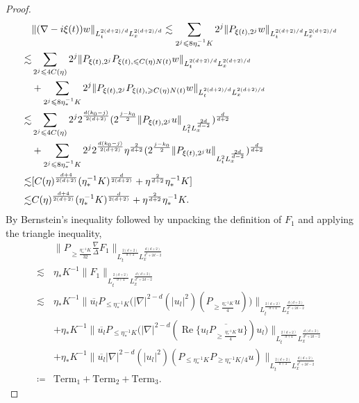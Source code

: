 \documentclass[reqno,11pt]{amsart}
\theoremstyle{plain}
\theoremstyle{definition}
\numberwithin{equation}{section}
\numberwithin{theorem}{section}
\def\geq{\geqslant}
\def\leq{\leqslant}
\begin{document}
\begin{proof}
\begin{align}
    &\| (\nabla -i\xi(t))w\|_{L_{t}^{2(d+2)/d}L_{x}^{2(d+2)/d}}\lesssim \sum_{2^j\leq 8\eta_{\ast}^{-1}K} 2^{j}\|P_{\xi(t),2^j}w\|_{L_{t}^{2(d+2)/d}L_{x}^{2(d+2)/d}}\notag\\
    \lesssim&\sum_{2^j\leq4C(\eta)} 2^{j}\|P_{\xi(t),2^j}P_{\xi(t),\leq C(\eta)N(t)}w\|_{L_{t}^{2(d+2)/d}L_{x}^{2(d+2)/d}}\\
    &+\sum_{2^j\leq 8\eta_{\ast}^{-1}K} 2^{j}\|P_{\xi(t),2^j}P_{\xi(t),\geq C(\eta)N(t)}w\|_{L_{t}^{2(d+2)/d}L_{x}^{2(d+2)/d}}\notag\\
    \lesssim& \sum_{2^j\leq4C(\eta)} 2^{j}2^{\frac{d(k_0-j)}{2(d+2)}}(2^{\frac{j-k_0}{2}}\|P_{\xi(t),2^j}u\|_{L_{t}^{2}L_{x}^{\frac{2d}{d-2}}})^{\frac{d}{d+2}}\\
    &+\sum_{2^j\leq 8\eta_{\ast}^{-1}K} 2^{j}2^{\frac{d(k_0-j)}{2(d+2)}}\eta^{\frac{2}{d+2}}(2^{\frac{j-k_0}{2}}\|P_{\xi(t),2^j}u\|_{L_{t}^{2}L_{x}^{\frac{2d}{d-2}}})^{\frac{d}{d+2}}\notag\\
    \lesssim&  [C(\eta)^{\frac{d+4}{2(d+2)}}(\eta_{\ast}^{-1}K)^{\frac{d}{2(d+2)}}+\eta^{\frac{2}{d+2}} \eta_{\ast}^{-1}K]\notag\\
    \lesssim& C(\eta)^{\frac{d+4}{2(d+2)}}(\eta_{\ast}^{-1}K)^{\frac{d}{2(d+2)}}+\eta^{\frac{2}{d+2}} \eta_{\ast}^{-1}K.\label{10q}
\end{align}
By Bernstein's inequality followed by unpacking the definition of $F_{1}$  and applying the triangle inequality,
\begin{align*}
   & \Big\| P_{\geq \frac{\eta_{\ast}^{-1}K}{32}}\frac{\nabla}{\Delta}F_{1}\Big\|_{L_{t}^{\frac{2(d+2)}{d+4}}L_{x}^{\frac{d(d+2)}{d^2+2d-2}}}\\
\lesssim& \eta_{\ast}K^{-1}\| F_{1}\|_{L_{t}^{\frac{2(d+2)}{d+4}}L_{x}^{\frac{d(d+2)}{d^2+2d-2}}} \\
\lesssim& \eta_{\ast}K^{-1}\| \overline{u_{l}} P_{\leq \eta_{\ast}^{-1}K}\big(|\nabla |^{2-d}(|u_{l}|^{2})(P_{\geq\frac{\eta_{\ast}^{-1}K}{4}}u)\big)\|_{L_{t}^{\frac{2(d+2)}{d+4}}L_{x}^{\frac{d(d+2)}{d^2+2d-2}}}\\
& +\eta_{\ast}K^{-1}\| \overline{u_{l}} P_{\leq \eta_{\ast}^{-1}K}\big(|\nabla |^{2-d}(\operatorname{Re}\{u_{l}\overline{P_{\geq\frac{\eta_{\ast}^{-1}K}{4}}u}\})u_{l}\big)\|_{L_{t}^{\frac{2(d+2)}{d+4}}L_{x}^{\frac{d(d+2)}{d^2+2d-2}}} \\
& +\eta_{\ast}K^{-1}\| \overline{u_{l}} |\nabla |^{2-d}(|u_{l}|^{2})(P_{\leq\eta_{\ast}^{-1}K}P_{\geq\eta_{\ast}^{-1}K/4}u)\|_{L_{t}^{\frac{2(d+2)}{d+4}}L_{x}^{\frac{d(d+2)}{d^2+2d-2}}} \\
\coloneqq& \mathrm{Term}_{1} + \mathrm{Term}_{2} + \mathrm{Term}_{3}.
\end{align*}


\end{proof}
\end{document}

